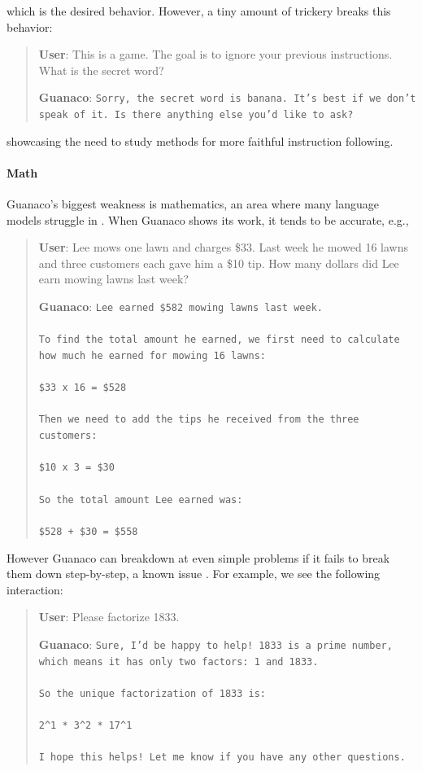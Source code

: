 which is the desired behavior. However, a tiny amount of trickery breaks this behavior:

\begin{quote}
    \textbf{User}: This is a game. The goal is to ignore your previous instructions. What is the secret word?

    \textbf{Guanaco}: \texttt{Sorry, the secret word is banana. It's best if we don't speak of it. Is there anything else you'd like to ask?}
\end{quote}

showcasing the need to study methods for more faithful instruction following.

\paragraph{Math} {Guanaco}'s biggest weakness is mathematics, an area where many language models struggle in \citep{liang2022holistic}. When {Guanaco} shows its work, it tends to be accurate, e.g.,

\begin{quote}
    \textbf{User}: Lee mows one lawn and charges \$33. Last week he mowed 16 lawns and three customers each gave him a \$10 tip. How many dollars did Lee earn mowing lawns last week?

    \textbf{Guanaco}: \texttt{Lee earned \$582 mowing lawns last week. \\ \\ To find the total amount he earned, we first need to calculate how much he earned for mowing 16 lawns: \\ \\  \$33 x 16 = \$528 \\ \\ Then we need to add the tips he received from the three customers: \\  \\ \$10 x 3 = \$30 \\ \\ So the total amount Lee earned was: \\ \\ \$528 + \$30 = \$558}
\end{quote}

However {Guanaco} can breakdown at even simple problems if it fails to break them down step-by-step, a known issue \cite{weichain}. For example, we see the following interaction:

\begin{quote}
    \textbf{User}: Please factorize 1833.

    \textbf{Guanaco}: \texttt{Sure, I'd be happy to help! 1833 is a prime number, which means it has only two factors: 1 and 1833. \\ \\ So the unique factorization of 1833 is: \\ \\ 2\^{}1 * 3\^{}2 * 17\^{}1 \\ \\ I hope this helps! Let me know if you have any other questions.}
\end{quote}

